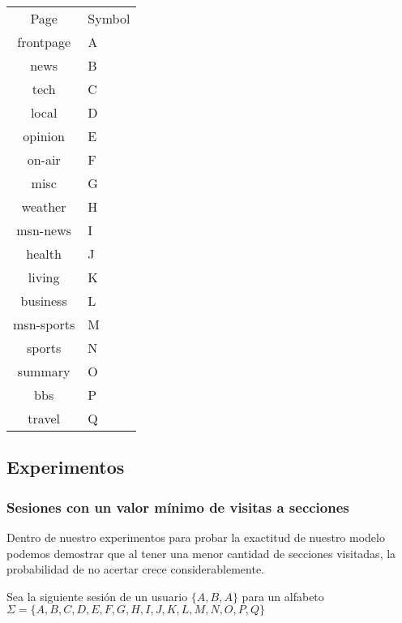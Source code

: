 \begin{table}[]
	\centering

	\label{table-list-symbol}
	\begin{tabular}{cl}
		Page       & Symbol \\ \cline{1-2}
		frontpage  & A      \\
		news       & B      \\
		tech       & C      \\
		local      & D      \\
		opinion    & E      \\
		on-air     & F      \\
		misc       & G      \\
		weather    & H      \\
		msn-news   & I      \\
		health     & J      \\
		living     & K      \\
		business   & L      \\
		msn-sports & M      \\
		sports     & N      \\
		summary    & O      \\
		bbs        & P      \\
		travel     & Q      \\ 
	\end{tabular}
\end{table}





\subsection{Experimentos}
\vspace{1cm}
\subsubsection{Sesiones con un valor mínimo de visitas a secciones}

Dentro de nuestro experimentos para probar la exactitud de nuestro modelo podemos demostrar que al tener una menor cantidad de secciones visitadas, la probabilidad de no acertar crece considerablemente.


Sea la siguiente sesión de un usuario 
$\{A , B , A  \}  $ para un alfabeto $\Sigma=\{A,B,C,D,E,F,G,H,I,J,K,L,M,N,O,P,Q \} $


